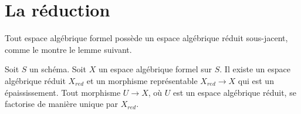 






\section{La réduction}
\label{section-reduction}

\noindent
Tout espace algébrique formel possède un espace algébrique réduit
sous-jacent, comme le montre le lemme suivant.

\begin{lemma}
\label{lemma-reduction-formal-algebraic-space}
Soit $S$ un schéma. Soit $X$ un espace algébrique formel sur $S$.
Il existe un espace algébrique réduit $X_{red}$ et un morphisme représentable
$X_{red} \to X$ qui est un épaississement. Tout morphisme $U \to X$,
où $U$ est un espace algébrique réduit, se factorise de manière unique par $X_{red}$.
\end{lemma}

